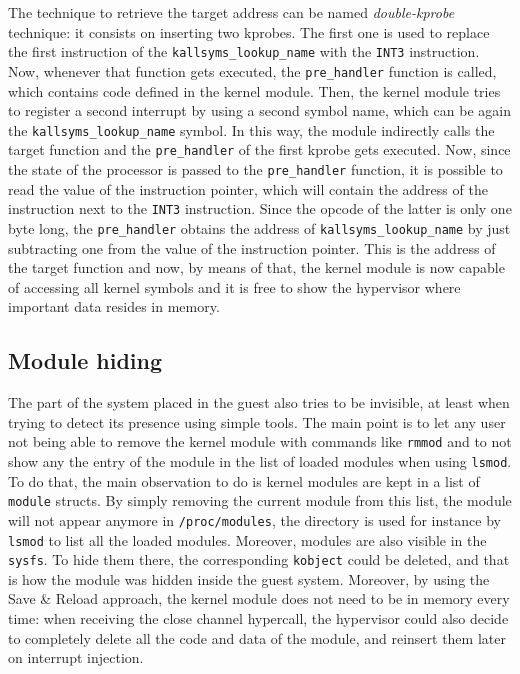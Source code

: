 The technique to retrieve the target address can be named \emph{double-kprobe} technique: it consists on inserting two kprobes. The first one is used to replace the first instruction of the  \texttt{kallsyms\_lookup\_name} with the \texttt{INT3} instruction. Now, whenever that function gets executed, the \texttt{pre\_handler} function is called, which contains code defined in the kernel module. Then, the kernel module tries to register a second interrupt by using a second symbol name, which can be again the \texttt{kallsyms\_lookup\_name} symbol. In this way, the module indirectly calls the target function and the \texttt{pre\_handler} of the first kprobe gets executed. Now, since the state of the processor is passed to the \texttt{pre\_handler} function, it is possible to read the value of the instruction pointer, which will contain the address of the instruction next to the \texttt{INT3} instruction. Since the opcode of the latter is only one byte long, the \texttt{pre\_handler} obtains the address of \texttt{kallsyms\_lookup\_name} by just subtracting one from the value of the instruction pointer. This is the address of the target function and now, by means of that, the kernel module is now capable of accessing all kernel symbols and it is free to show the hypervisor where important data resides in memory.


\subsection{Module hiding}
The part of the system placed in the guest also tries to be invisible, at least when trying to detect its presence using simple tools. The main point is to let any user not being able to remove the kernel module with commands like \texttt{rmmod} and to not show any the entry of the module in the list of loaded modules when using \texttt{lsmod}. To do that, the main observation to do is kernel modules are kept in a list of \texttt{module} structs. By simply removing the current module from this list, the module will not appear anymore in \texttt{/proc/modules}, the directory is used for instance by \texttt{lsmod} to list all the loaded modules. Moreover, modules are also visible in the \texttt{sysfs}. To hide them there, the corresponding \texttt{kobject} could be deleted, and that is how the module was hidden inside the guest system.  Moreover, by using the Save \& Reload approach, the kernel module does not need to be in memory every time: when receiving the close channel hypercall, the hypervisor could also decide to completely delete all the code and data of the module, and reinsert them later on interrupt injection. 

